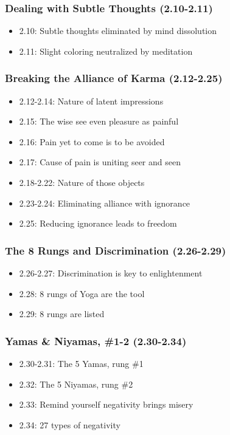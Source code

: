 \begin{frame}[fragile]\frametitle{Dealing with Subtle Thoughts (2.10-2.11)}
\begin{itemize}
\item 2.10: Subtle thoughts eliminated by mind dissolution
\item 2.11: Slight coloring neutralized by meditation  
\end{itemize}
\end{frame}

\begin{frame}[fragile]\frametitle{Breaking the Alliance of Karma (2.12-2.25)}
\begin{itemize}
\item 2.12-2.14: Nature of latent impressions
\item 2.15: The wise see even pleasure as painful
\item 2.16: Pain yet to come is to be avoided
\item 2.17: Cause of pain is uniting seer and seen
\item 2.18-2.22: Nature of those objects
\item 2.23-2.24: Eliminating alliance with ignorance
\item 2.25: Reducing ignorance leads to freedom
\end{itemize}  
\end{frame}

\begin{frame}[fragile]\frametitle{The 8 Rungs and Discrimination (2.26-2.29)}
\begin{itemize}
\item 2.26-2.27: Discrimination is key to enlightenment
\item 2.28: 8 rungs of Yoga are the tool  
\item 2.29: 8 rungs are listed
\end{itemize}
\end{frame}

\begin{frame}[fragile]\frametitle{Yamas \& Niyamas, \#1-2 (2.30-2.34)}
\begin{itemize}
\item 2.30-2.31: The 5 Yamas, rung \#1
\item 2.32: The 5 Niyamas, rung \#2
\item 2.33: Remind yourself negativity brings misery
\item 2.34: 27 types of negativity
\end{itemize}
\end{frame}

